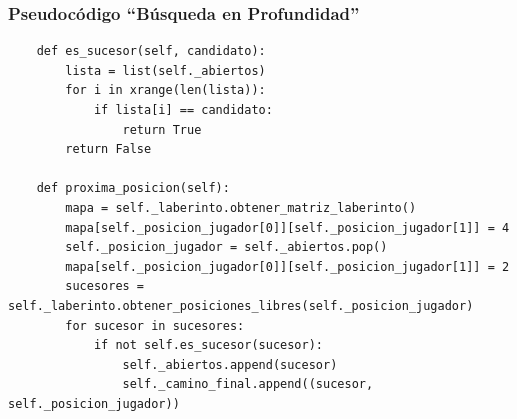 \documentclass[letter, titlepage, 10pt]{article}
\begin{document}
\newpage
\subsubsection{Pseudocódigo ``Búsqueda en Profundidad''}
\begin{lstlisting}
    def es_sucesor(self, candidato):
        lista = list(self._abiertos)
        for i in xrange(len(lista)):
            if lista[i] == candidato:
                return True
        return False

    def proxima_posicion(self):
        mapa = self._laberinto.obtener_matriz_laberinto()
        mapa[self._posicion_jugador[0]][self._posicion_jugador[1]] = 4
        self._posicion_jugador = self._abiertos.pop()
        mapa[self._posicion_jugador[0]][self._posicion_jugador[1]] = 2
        sucesores = self._laberinto.obtener_posiciones_libres(self._posicion_jugador)
        for sucesor in sucesores:
            if not self.es_sucesor(sucesor):
                self._abiertos.append(sucesor)
                self._camino_final.append((sucesor, self._posicion_jugador))
\end{lstlisting}
\end{document}
